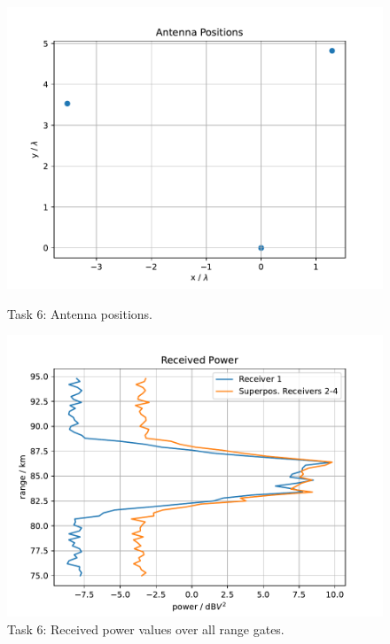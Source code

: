 \begin{figure}
    \centering
    \begin{minipage}{0.48\textwidth}
        \centering
        \includegraphics[width=\textwidth]{graphics/t6/t6_antpos.pdf}
    \caption{Task 6: Antenna positions.}
    \label{fig:t6-antpos}
    \end{minipage}\hfill
    \begin{minipage}{0.48\textwidth}
        \centering
        \includegraphics[width=\textwidth]{graphics/t6/t6_power.pdf}
 \caption{Task 6: Received power values over all range gates.}
    \label{fig:t6-power}
    \end{minipage}
\end{figure}

